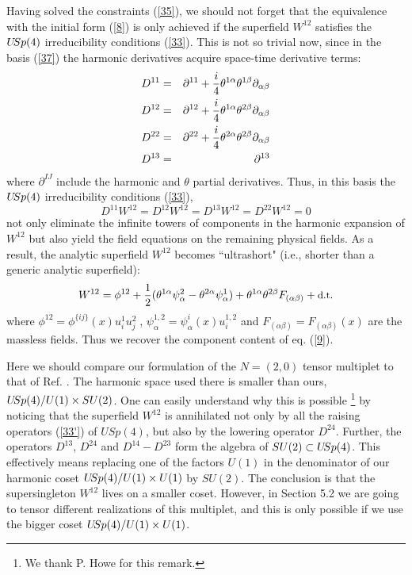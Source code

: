 \documentclass[a4paper,12pt]{article}
\begin{document}
Having solved the constraints (\ref{35}), we should not forget 
that the equivalence with the initial form (\ref{8}) is only 
achieved if the superfield $W^{12}$ satisfies the $U\hskip-2pt 
Sp(4)$ irreducibility conditions (\ref{33}). This is not so 
trivial now, since in the basis (\ref{37}) the harmonic 
derivatives acquire space-time derivative terms: 
\begin{eqnarray}
  D^{11}&=&\partial^{11}+ 
{i\over 4}\theta^{1\alpha}\theta^{1\beta}\partial_{\alpha\beta} \nonumber\\
  D^{12}&=&\partial^{12}+ 
{i\over 4}\theta^{1\alpha}\theta^{2\beta}\partial_{\alpha\beta} 
\label{38}\\ 
  D^{22}&=&\partial^{22}+ {i\over 
4}\theta^{2\alpha}\theta^{2\beta}\partial_{\alpha\beta} 
\nonumber\\
  D^{13}&=&\partial^{13} \nonumber 
\end{eqnarray}
where $\partial^{IJ}$ include the harmonic and $\theta$ partial 
derivatives. Thus, in this basis the $U\hskip-2pt Sp(4)$ 
irreducibility conditions (\ref{33}), 
\begin{equation}\label{33'}
   D^{11}W^{12} = D^{12}W^{12} = D^{13}W^{12} = D^{22}W^{12} =0
\end{equation}
not only eliminate the infinite towers of components in the 
harmonic expansion of $W^{12}$ but also yield the field equations 
on the remaining physical fields. As a result, the analytic 
superfield $W^{12}$ becomes ``ultrashort" (i.e., shorter than a 
generic analytic superfield): 
\begin{equation}\label{39}
  W^{12} = \phi^{12} + {1\over 2}(\theta^{1\alpha}\psi^2_\alpha - 
\theta^{2\alpha}\psi^1_\alpha) + \theta^{1\alpha}\theta^{2\beta} 
F_{(\alpha\beta)} + \mbox{\small d.t.} 
\end{equation}
where $\phi^{12}=\phi^{\{ij\}}(x)u^1_iu^2_j\;$, $\psi^{1,2}_\alpha 
= \psi^i_\alpha(x) u^{1,2}_i$ and 
$F_{(\alpha\beta)}=F_{(\alpha\beta)}(x)$ are the massless fields. 
Thus we recover the component content of eq. (\ref{9}).  

   
Here we should compare our formulation of the $N=(2,0)$ tensor 
multiplet to that of Ref. \cite{Howe}. The harmonic space used 
there is smaller than ours, $U\hskip-2pt Sp(4)/U(1)\times SU(2)$. 
One can easily understand why this is possible \footnote{We thank 
P. Howe for this remark.} by noticing that the superfield $W^{12}$ 
is annihilated not only by all the raising operators (\ref{33'}) 
of $USp(4)$, but also by the lowering operator $D^{24}$. Further, 
the operators $D^{13}$, $D^{24}$ and $D^{14}-D^{23}$ form the 
algebra of $SU(2)\subset U\hskip-2pt Sp(4)$. This effectively 
means replacing one of the factors $U(1)$ in the denominator of 
our harmonic coset $U\hskip-2pt Sp(4)/U(1)\times U(1)$ by $SU(2)$. 
The conclusion is that the supersingleton $W^{12}$ lives on a 
smaller coset. However, in Section 5.2 we are going to tensor 
different realizations of this multiplet, and this is only 
possible if we use the bigger coset $U\hskip-2pt Sp(4)/U(1)\times 
U(1)$.  
\end{document}
